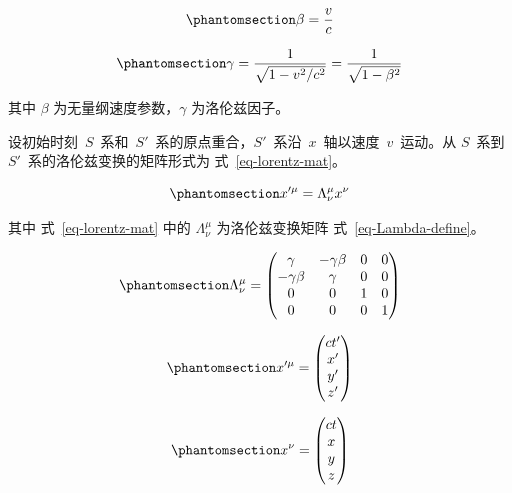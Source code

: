 \documentclass[
  chinese,
  a4paper,
  UTF8,
  12pt,
  oneside,
  openany]{ctexbook}
\theoremstyle{plain}
\theoremstyle{plain}
\theoremstyle{plain}
\theoremstyle{definition}
\theoremstyle{plain}
\theoremstyle{plain}
\theoremstyle{remark}
\begin{document}
\begin{equation}\protect\phantomsection\label{eq-beta}{
\beta = \frac{v}{c}
}\end{equation}

\begin{equation}\protect\phantomsection\label{eq-gamma}{
\gamma = \frac{1}{\sqrt{1 - v^{2}/c^{2}}} = \frac{1}{\sqrt{1 - \beta^{2}}}
}\end{equation}

其中 \(\beta\) 为无量纲速度参数，\(\gamma\) 为洛伦兹因子。

设初始时刻~\(S\)~系和~\(S'\)~系的原点重合，\(S'\)~系沿~\(x\)~轴以速度~\(v\)~运动。从
\(S\)~系到~\(S'\)~系的洛伦兹变换的矩阵形式为 式~\ref{eq-lorentz-mat}。

\begin{equation}\protect\phantomsection\label{eq-lorentz-mat}{
x'^{\mu} = \Lambda_{\nu}^{\mu}x^{\nu}
}\end{equation}

其中 式~\ref{eq-lorentz-mat} 中的 \(\Lambda_{\nu}^{\mu}\)
为洛伦兹变换矩阵 式~\ref{eq-Lambda-define}。

\begin{equation}\protect\phantomsection\label{eq-Lambda-define}{
\Lambda_{\nu}^{\mu} = \begin{pmatrix}
\gamma & -\gamma\beta & 0 & 0 \\
-\gamma\beta & \gamma & 0 & 0 \\
0 & 0 & 1 & 0 \\
0 & 0 & 0 & 1
\end{pmatrix}
}\end{equation}

\begin{equation}\protect\phantomsection\label{eq-x-prime}{
x'^{\mu} = \begin{pmatrix}
ct' \\
x' \\
y' \\
z'
\end{pmatrix}
}\end{equation}

\begin{equation}\protect\phantomsection\label{eq-x}{
x^{\nu} = \begin{pmatrix}
ct \\
x \\
y \\
z
\end{pmatrix}
}\end{equation}
\end{document}
